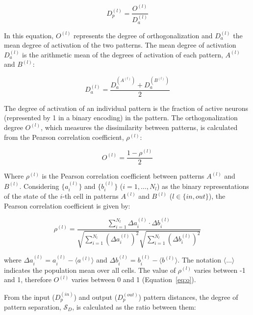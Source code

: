 \begin{equation}
    \label{eq:dp}
    D_p^{(l)} = \frac{O^{(l)}}{D_a^{(l)}}
\end{equation}

In this equation, $O^{(l)}$ represents the degree of orthogonalization and $D_a^{(l)}$ the mean degree of activation of the
two patterns. The mean degree of activation $D_a^{(l)}$ is the arithmetic mean of the degrees of activation of each pattern,
$A^{(l)}$ and $B^{(l)}$:

\begin{equation}
    \label{eq:da}
    D_a^{(l)} = \frac{D_a^{(A^{(l)})} + D_a^{(B^{(l)})}}{2}
\end{equation}

The degree of activation of an individual pattern is the fraction of active neurons (represented by 1 in a binary encoding) in
the pattern. The orthogonalization degree $O^{(l)}$, which measures the dissimilarity between patterns, is calculated from the
Pearson correlation coefficient, $\rho^{(l)}$:

\begin{equation}
    \label{eq:o}
    O^{(l)} = \frac{1 - \rho^{(l)}}{2}
\end{equation}

Where $\rho^{(l)}$ is the Pearson correlation coefficient between patterns $A^{(l)}$ and $B^{(l)}$.
Considering $\{a_i^{(l)}\}$ and $\{b_i^{(l)}\}$ ($i=1, \dots, N_l$) as the binary representations of the state of the
$i$-th cell in patterns $A^{(l)}$ and $B^{(l)}$ ($l \in \{in, out\}$), the Pearson correlation coefficient is given by:

\begin{equation}
    \label{eq:pearson}
    \rho^{(l)} = \frac{\sum_{i=1}^{N_l} \Delta a_i^{(l)} \cdot \Delta b_i^{(l)}}{\sqrt{\sum_{i=1}^{N_l} {(\Delta a_i^{(l)})}^2} \sqrt{\sum_{i=1}^{N_l} {(\Delta b_i^{(l)})}^2}}
\end{equation}

where $\Delta a_i^{(l)} = a_i^{(l)} - \langle a^{(l)} \rangle$ and $\Delta b_i^{(l)} = b_i^{(l)} - \langle b^{(l)} \rangle$.
The notation $\langle \dots \rangle$ indicates the population mean over all cells. The value of $\rho^{(l)}$ varies between
-1 and 1, therefore $O^{(l)}$ varies between 0 and 1 (Equation~\ref{eq:o}).

From the input ($D_p^{(in)}$) and output ($D_p^{(out)}$) pattern distances, the degree of pattern separation,
$\mathcal{S}_D$, is calculated as the ratio between them:

